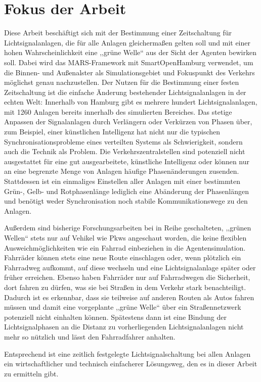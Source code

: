 %
%


\section{Fokus der Arbeit}\label{sec:focus-of-thesis}

Diese Arbeit beschäftigt sich mit der Bestimmung einer Zeitschaltung für Lichtsignalanlagen, die für alle Anlagen gleichermaßen gelten soll und mit einer hohen Wahrscheinlichkeit eine ,,grüne Welle`` aus der Sicht der Agenten bewirken soll.
Dabei wird das MARS-Framework mit SmartOpenHamburg verwendet, um die Binnen- und Außenalster als Simulationsgebiet und Fokuspunkt des Verkehrs möglichst genau nachzustellen.
Der Nutzen für die Bestimmung einer festen Zeitschaltung ist die einfache Änderung bestehender Lichtsignalanlagen in der echten Welt: Innerhalb von Hamburg gibt es mehrere hundert Lichtsignalanlagen, mit 1260 Anlagen bereits innerhalb des simulierten Bereiches.
Das stetige Anpassen der Signalanlagen durch Verlängern oder Verkürzen von Phasen über, zum Beispiel, einer künstlichen Intelligenz hat nicht nur die typischen Synchronisationsprobleme eines verteilten Systems als Schwierigkeit, sondern auch die Technik als Problem.
Die Verkehrszentralstellen sind potenziell nicht ausgestattet für eine gut ausgearbeitete, künstliche Intelligenz oder können nur an eine begrenzte Menge von Anlagen häufige Phasenänderungen zusenden.
Stattdessen ist ein einmaliges Einstellen aller Anlagen mit einer bestimmten Grün-, Gelb- und Rotphasenlänge lediglich eine Abänderung der Phasenlängen und benötigt weder Synchronisation noch stabile Kommunikationswege zu den Anlagen.

Außerdem sind bisherige Forschungsarbeiten bei in Reihe geschalteten, ,,grünen Wellen`` stets nur auf Vehikel wie Pkws angeschaut worden, die keine flexiblen Ausweichmöglichkeiten wie ein Fahrrad einbeziehen in die Agentensimulation.
Fahrräder können stets eine neue Route einschlagen oder, wenn plötzlich ein Fahrradweg aufkommt, auf diese wechseln und eine Lichtsignalanlage später oder früher erreichen.
Ebenso haben Fahrräder nur auf Fahrradwegen die Sicherheit, dort fahren zu dürfen, was sie bei Straßen in dem Verkehr stark benachteiligt.
Dadurch ist es erkennbar, dass sie teilweise auf anderen Routen als Autos fahren müssen und damit eine vorgeplante ,,grüne Welle`` über ein Straßennetzwerk potenziell nicht einhalten können.
Spätestens dann ist eine Bindung der Lichtsignalphasen an die Distanz zu vorherliegenden Lichtsignalanlagen nicht mehr so nützlich und lässt den Fahrradfahrer anhalten.

Entsprechend ist eine zeitlich festgelegte Lichtsignalschaltung bei allen Anlagen ein wirtschaftlicher und technisch einfacherer Lösungsweg, den es in dieser Arbeit zu ermitteln gibt.
